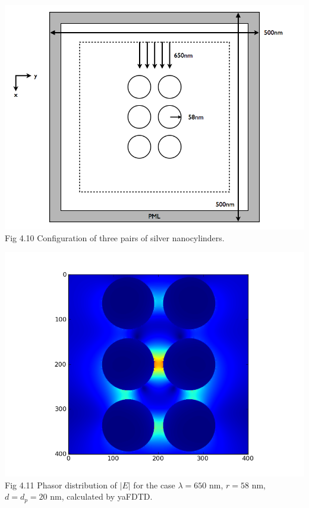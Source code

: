 \documentclass[openany]{book}
\begin{document}
\begin{center}
\includegraphics[scale=0.5]{images/open-cavity-config-r58.png}\\
Fig 4.10
Configuration of three pairs of silver nanocylinders.
\end{center}

\begin{center}
\includegraphics[scale=0.8]{images/etotal-r58.png}\\
Fig 4.11
Phasor distribution of $|E|$ for the case $\lambda = 650$ nm, $r = 58$ nm, $d = d_p = 20$ nm, calculated by yaFDTD.
\end{center}
\end{document}
